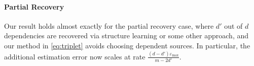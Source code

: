 \vspace{-0.5em}
\paragraph{Partial Recovery} Our result holds almost exactly for the partial recovery case, where $d'$ out of $d$ dependencies are recovered via structure learning or some other approach, and our method in \eqref{eq:triplet} avoids choosing dependent sources. In particular, the additional estimation error now scales at rate $\frac{(d - d') \varepsilon_{\max}  }{m - 2d'}$.




